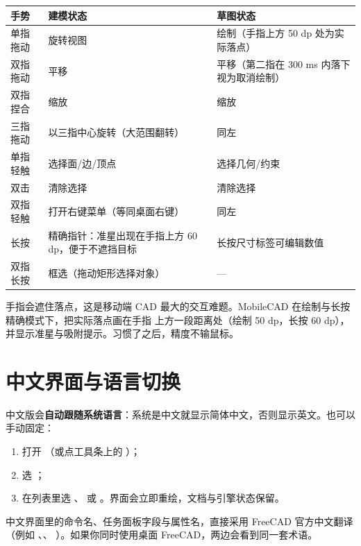 \begin{center}
\small
\begin{tabularx}{\linewidth}{@{}lXX@{}}
\toprule
\textbf{手势} & \textbf{建模状态} & \textbf{草图状态} \\
\midrule
单指拖动 & 旋转视图 & 绘制（手指上方 50 dp 处为实际落点）\\
双指拖动 & 平移 & 平移（第二指在 300 ms 内落下视为取消绘制）\\
双指捏合 & 缩放 & 缩放 \\
三指拖动 & 以三指中心旋转（大范围翻转） & 同左 \\
单指轻触 & 选择面/边/顶点 & 选择几何/约束 \\
双击 & 清除选择 & 清除选择 \\
双指轻触 & 打开右键菜单（等同桌面右键） & 同左 \\
长按 & 精确指针：准星出现在手指上方 60 dp，便于不遮挡目标 & 长按尺寸标签可编辑数值 \\
双指长按 & 框选（拖动矩形选择对象） & — \\
\bottomrule
\end{tabularx}
\end{center}

\begin{tip}[为什么指针在手指上方？]
手指会遮住落点，这是移动端 CAD 最大的交互难题。MobileCAD 在绘制与长按精确模式下，把实际落点画在手指
上方一段距离处（绘制 50 dp，长按 60 dp），并显示准星与吸附提示。习惯了之后，精度不输鼠标。
\end{tip}

\section{中文界面与语言切换}

中文版会\textbf{自动跟随系统语言}：系统是中文就显示简体中文，否则显示英文。也可以手动固定：

\begin{enumerate}
  \item 打开 （或点工具条上的 ）；
  \item 选 ；
  \item 在列表里选 、 或 。界面会立即重绘，文档与引擎状态保留。
\end{enumerate}


\begin{tip}[术语一致性]
中文界面里的命令名、任务面板字段与属性名，直接采用 FreeCAD 官方中文翻译（例如 、、
）。如果你同时使用桌面 FreeCAD，两边会看到同一套术语。
\end{tip}


